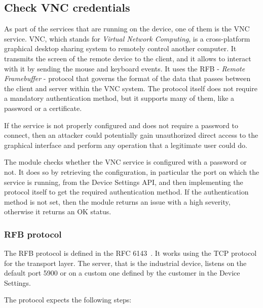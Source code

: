 \subsection{Check VNC credentials}

As part of the services that are running on the device, one of them is the VNC service. VNC, which stands for \textit{Virtual Network Computing}, is a cross-platform graphical desktop sharing system to remotely control another computer. It transmits the screen of the remote device to the client, and it allows to interact with it by sending the mouse and keyboard events. It uses the RFB - \textit{Remote Framebuffer} - protocol that governs the format of the data that passes between the client and server within the VNC system. The protocol itself does not require a mandatory authentication method, but it supports many of them, like a password or a certificate.

If the service is not properly configured and does not require a password to connect, then an attacker could potentially gain unauthorized direct access to the graphical interface and perform any operation that a legitimate user could do.

The module checks whether the VNC service is configured with a password or not. It does so by retrieving the configuration, in particular the port on which the service is running, from the Device Settings API, and then implementing the protocol itself to get the required authentication method. If the authentication method is not set, then the module returns an issue with a high severity, otherwise it returns an OK status.

\subsubsection{RFB protocol}

The RFB protocol is defined in the RFC 6143~\cite{rfc6143}. It works using the TCP protocol for the transport layer. The server, that is the industrial device, listens on the default port 5900 or on a custom one defined by the customer in the Device Settings.

The protocol expects the following steps:


